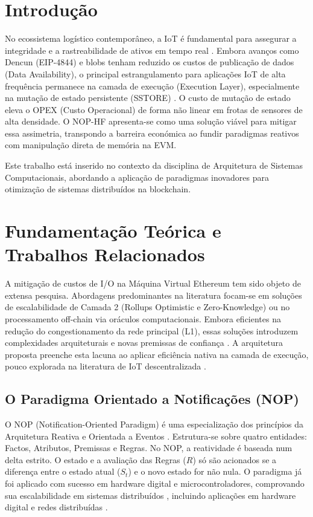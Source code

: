 \documentclass[conference]{IEEEtran}
\begin{document}
\section{Introdução}
No ecossistema logístico contemporâneo, a IoT é fundamental para assegurar a integridade e a rastreabilidade de ativos em tempo real \cite{mdpi_coldchain}. Embora avanços como Dencun (EIP-4844) e blobs \cite{eip4844} tenham reduzido os custos de publicação de dados (Data Availability), o principal estrangulamento para aplicações IoT de alta frequência permanece na camada de execução (Execution Layer), especialmente na mutação de estado persistente (SSTORE) \cite{perez2020}. O custo de mutação de estado eleva o OPEX (Custo Operacional) de forma não linear em frotas de sensores de alta densidade. O NOP-HF apresenta-se como uma solução viável para mitigar essa assimetria, transpondo a barreira económica ao fundir paradigmas reativos com manipulação direta de memória na EVM.\par

Este trabalho está inserido no contexto da disciplina de Arquitetura de Sistemas Computacionais, abordando a aplicação de paradigmas inovadores para otimização de sistemas distribuídos na blockchain.

\section{Fundamentação Teórica e Trabalhos Relacionados}
A mitigação de custos de I/O na Máquina Virtual Ethereum tem sido objeto de extensa pesquisa. Abordagens predominantes na literatura focam-se em soluções de escalabilidade de Camada 2 (Rollups Optimistic e Zero-Knowledge) ou no processamento off-chain via oráculos computacionais. Embora eficientes na redução do congestionamento da rede principal (L1), essas soluções introduzem complexidades arquiteturais e novas premissas de confiança \cite{sstore_costs}. A arquitetura proposta preenche esta lacuna ao aplicar eficiência nativa na camada de execução, pouco explorada na literatura de IoT descentralizada \cite{reyna2018} \cite{saberi2019}.

\subsection{O Paradigma Orientado a Notificações (NOP)}
O NOP (Notification-Oriented Paradigm) é uma especialização dos princípios da Arquitetura Reativa e Orientada a Eventos \cite{simao2012} \cite{simao2016}. Estrutura-se sobre quatro entidades: Factos, Atributos, Premissas e Regras. No NOP, a reatividade é baseada num delta estrito. O estado e a avaliação das Regras ($R$) só são acionados se a diferença entre o estado atual ($S_t$) e o novo estado for não nula. O paradigma já foi aplicado com sucesso em hardware digital e microcontroladores, comprovando sua escalabilidade em sistemas distribuídos \cite{nop_hardware} \cite{nop_microcontroladores}, incluindo aplicações em hardware digital \cite{nop_patent} e redes distribuídas \cite{nop_ip}.
\end{document}

